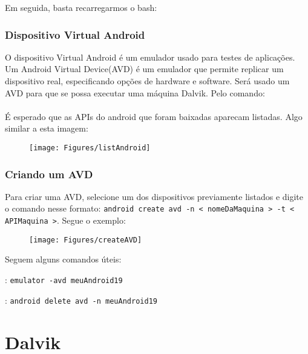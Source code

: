 \documentclass[hidelinks,12pt]{article}
\begin{document}
	
	
	Em seguida, basta recarregarmos o bash:\\
	
	\noindent{}
	
	\subsubsection{Dispositivo Virtual Android}
	
	O dispositivo Virtual Android é um emulador usado para testes de aplicações. Um Android Virtual Device(AVD) é um emulador que permite replicar um dispositivo real, especificando opções de hardware e software. Será usado um AVD para que se possa executar uma máquina Dalvik. Pelo comando:\\
	
	\noindent{}\\
	
	É esperado que as APIs do android que foram baixadas aparecam listadas. Algo similar a esta imagem:\\
	
	\begin{figure}[h!]
		\centering
		\texttt{[image: Figures/listAndroid]}
	\end{figure}
	
	\newpage
	\subsubsection{Criando um AVD}
	
	Para criar uma AVD, selecione um dos dispositivos previamente listados e digite o comando nesse formato:
	\texttt{android create avd -n < nomeDaMaquina > -t < APIMaquina  >}. Segue o exemplo:
	
	\begin{figure}[h!]
		\centering
		\texttt{[image: Figures/createAVD]}
	\end{figure}
	
	Seguem alguns comandos úteis:
	
	{\color{blue}{Ver}} : \texttt{emulator -avd meuAndroid19}
	
	{\color{red}{Deletar}} : \texttt{android delete avd -n meuAndroid19}	
	
	\section{Dalvik}
	
\end{document}
